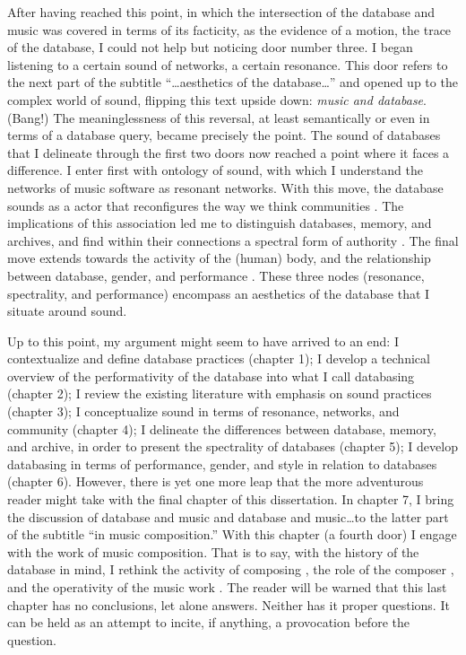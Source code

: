 After having reached this point, in which the intersection of the database and music was covered in terms of its facticity, as the evidence of a motion, the trace of the database, I could not help but noticing door number three. I began listening to a certain sound of networks, a certain resonance. This door refers to the next part of the subtitle ``\dots aesthetics of the database\dots'' and opened up to the complex world of sound, flipping this text upside down: \textit{music and database}. (Bang!) The meaninglessness of this reversal, at least semantically or even in terms of a database query, became precisely the point. The sound of databases that I delineate through the first two doors now reached a point where it faces a difference. I enter first with  ontology of sound, with which I understand the networks of music software as resonant networks. With this move, the database sounds as a actor \parencite{Lat90:On} that reconfigures the way we think communities \parencite{Nan91:The}. The implications of this association led me to distinguish databases, memory, and archives, and find within their connections a spectral form of authority \parencites{Der78:Wri}{Der95:Arc}. The final move extends towards the activity of the (human) body, and the relationship between database, gender, and performance \parencite{But88:Per}. These three nodes (resonance, spectrality, and performance) encompass an aesthetics of the database that I situate around sound. 

Up to this point, my argument might seem to have arrived to an end: I contextualize and define database practices (chapter 1); I develop a technical overview of the performativity of the database into what I call databasing (chapter 2); I review the existing literature with emphasis on sound practices (chapter 3); I conceptualize sound in terms of resonance, networks, and community (chapter 4); I delineate the differences between database, memory, and archive, in order to present the spectrality of databases (chapter 5); I develop databasing in terms of performance, gender, and style in relation to databases (chapter 6). However, there is yet one more leap that the more adventurous reader might take with the final chapter of this dissertation. In chapter 7, I bring the discussion of database and music and database and music\dots to the latter part of the subtitle ``in music composition.'' With this chapter (a fourth door) I engage with the work of music composition. That is to say, with the history of the database in mind, I rethink the activity of composing \parencite{Vag01:Som}, the role of the composer \parencite{Lew99:Int}, and the operativity of the music work \parencite{Cas00:The}. The reader will be warned that this last chapter has no conclusions, let alone answers. Neither has it proper questions. It can be held as an attempt to incite, if anything, a provocation before the question.

